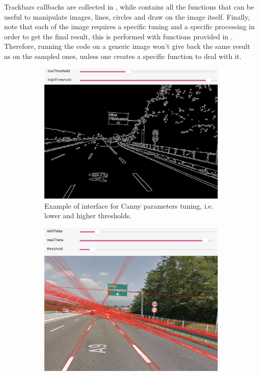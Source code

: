 \documentclass[twoside,onecolumn]{article}
\theoremstyle{definition}
\begin{document}
Trackbars callbacks are collected in , while  contains all the functions that can be useful to manipulate images, lines, circles and draw on the image itself.
Finally, note that each of the image requires a specific tuning and a specific processing in order to get the final result, this is performed with functions provided in . Therefore, running the code on a generic image won't give back the same result as on the sampled ones, unless one creates a specific function to deal with it.

\begin{figure} \centering
\begin{subfigure}{0.5\textwidth}
  \includegraphics[width=\textwidth]{../results/tuningEdge.png}
\caption{ Example of interface for Canny parameters tuning, i.e. lower and higher thresholds.}\label{fig:tuningedge}
\end{subfigure} \quad
\begin{subfigure}{0.46\textwidth}
\includegraphics[width=\textwidth]{../results/tuningLines.png}

\end{subfigure}
\end{figure}
\end{document}
